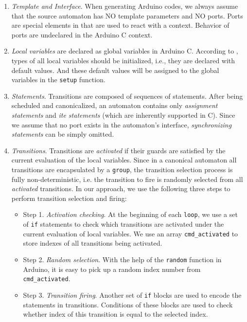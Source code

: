 \begin{enumerate}
    \item \emph{Template and Interface}. When generating Arduino codes, we always assume that the source automaton has NO template parameters and NO ports. Ports are special elements in \lang{} that are used to react with a \lang{} context. Behavior of ports are undeclared in the Arduino C context.
    \item \emph{Local variables} are declared as global variables in Arduino C. According to \cite{LiFacsMediator2017}, types of all local variables should be initialized, i.e., they are declared with default values. And these default values will be assigned to the global variables in the \texttt{setup} function.
    \item \emph{Statements}. Transitions are composed of sequences of statements. After being scheduled and canonicalized, an automaton contains only \emph{assignment statements} and \emph{ite statements} (which are inherently supported in C). Since we assume that no port exists in the automaton's interface, \emph{synchronizing statements} can be simply omitted. 
    \item \emph{Transitions}. Transitions are \emph{activated} if their guards are satisfied by the current evaluation of the local variables. Since in a canonical automaton all transitions are encapsulated by a \texttt{group}, the transition selection process is fully non-deterministic, i.e. the transition to fire is randomly selected from all \emph{activated} transitions. In our approach, we use the following three steps to perform transition selection and firing:
    \begin{itemize}
        \item Step 1. \emph{Activation checking}. At the beginning of each \texttt{loop}, we use a set of \texttt{if} statements to check which transitions are activated under the current evaluation of local variables. We use an array \texttt{cmd\_activated} to store indexes of all transitions being activated.
        \item Step 2. \emph{Random selection}. With the help of the \texttt{random} function in Arduino, it is easy to pick up a random index number from \texttt{cmd\_activated}.
        \item Step 3. \emph{Transition firing}. Another set of \texttt{if} blocks are used to encode the statements in transitions. Conditions of these blocks are used to check whether index of this transition is equal to the selected index.
    \end{itemize}
\end{enumerate}

